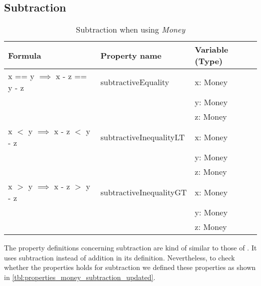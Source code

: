 \subsection*{Subtraction}
\label{ssct:properties_subtraction_updated}
\begin{table}[!ht]
\centering
\begin{tabular}{lll}
\hline
                        \textbf{Formula}                    & \textbf{Property name}  & \textbf{Variable (Type)} \\ \hline
\rowcolor[HTML]{EFEFEF} x == y $\implies$ x - z == y - z    & subtractiveEquality     & x: Money                 \\
\rowcolor[HTML]{EFEFEF}                                     &                         & y: Money                 \\
\rowcolor[HTML]{EFEFEF}                                     &                         & z: Money                 \\
                        x $<$ y $\implies$ x - z $<$ y - z  & subtractiveInequalityLT & x: Money                 \\
                                                            &                         & y: Money                 \\
                                                            &                         & z: Money                 \\
\rowcolor[HTML]{EFEFEF} x $>$ y $\implies$ x - z $>$ y - z  & subtractiveInequalityGT & x: Money                 \\
\rowcolor[HTML]{EFEFEF}                                     &                         & y: Money                 \\
\rowcolor[HTML]{EFEFEF}                                     &                         & z: Money                 \\ \hline
\end{tabular}
\caption{Subtraction when using \textit{Money}}
\label{tbl:properties_money_subtraction_updated}
\end{table}
\FloatBarrier\noindent
The property definitions concerning subtraction are kind of similar to those of
. It uses subtraction instead of
addition in its definition. Nevertheless, to check whether the properties holds
for subtraction we defined these properties as shown in
\autoref{tbl:properties_money_subtraction_updated}.

